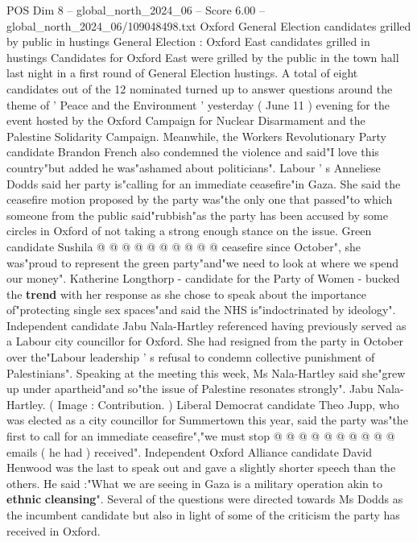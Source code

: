 \begin{textsample}{POS Dim 8 – global\_north\_2024\_06 – Score 6.00 – global\_north\_2024\_06/109048498.txt}  \label{ex:f8_pos_252}
Oxford General Election candidates grilled by public in hustings General Election : Oxford East candidates grilled in hustings Candidates for Oxford East were grilled by the public in the town hall last night in a first round of General Election hustings.
A total of eight candidates out of the 12 nominated turned up to answer questions around the theme of ' Peace and the Environment ' yesterday ( June 11 ) evening for the event hosted by the Oxford Campaign for Nuclear Disarmament and the Palestine Solidarity Campaign.
Meanwhile, the Workers Revolutionary Party candidate Brandon French also condemned the violence and said"I love this country"but added he was"ashamed about politicians".
Labour ' s Anneliese Dodds said her party is"calling for an immediate ceasefire"in Gaza.
She said the ceasefire motion proposed by the party was"the only one that passed"to which someone from the public said"rubbish"as the party has been accused by some circles in Oxford of not taking a strong enough stance on the issue.
Green candidate Sushila @ @ @ @ @ @ @ @ @ @ ceasefire since October", she was"proud to represent the green party"and"we need to look at where we spend our money".
Katherine Longthorp - candidate for the Party of Women - bucked the \textbf{trend} with her response as she chose to speak about the importance of"protecting single sex spaces"and said the NHS is"indoctrinated by ideology".
Independent candidate Jabu Nala-Hartley referenced having previously served as a Labour city councillor for Oxford.
She had resigned from the party in October over the"Labour leadership ' s refusal to condemn collective punishment of Palestinians".
Speaking at the meeting this week, Ms Nala-Hartley said she"grew up under apartheid"and so"the issue of Palestine resonates strongly".
Jabu Nala-Hartley. ( Image : Contribution. ) Liberal Democrat candidate Theo Jupp, who was elected as a city councillor for Summertown this year, said the party was"the first to call for an immediate ceasefire","we must stop @ @ @ @ @ @ @ @ @ @ emails ( he had ) received".
Independent Oxford Alliance candidate David Henwood was the last to speak out and gave a slightly shorter speech than the others.
He said :"What we are seeing in Gaza is a military operation akin to \textbf{ethnic} \textbf{cleansing}".
Several of the questions were directed towards Ms Dodds as the incumbent candidate but also in light of some of the criticism the party has received in Oxford.

\end{textsample}
